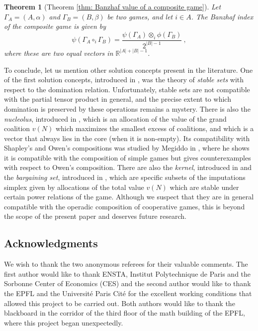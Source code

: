 \documentclass[a4paper,12pt]{amsart}
\newtheorem{theoremintro}{Theorem}
\begin{document}
\begin{theoremintro}[Theorem \ref{thm: Banzhaf value of a composite game}]
Let \(\Gamma_A = (A, \alpha)\) and \(\Gamma_B = (B, \beta)\) be two games, and let \(i \in A\). The Banzhaf index of the composite game is given by 
    \[
    \psi \left(\Gamma_A \circ_i \Gamma_B \right) = \frac{\psi(\Gamma_A) \otimes_i \phi(\Gamma_B)}{2^{\lvert B \rvert - 1}} ~,
    \]
    where these are two equal vectors in $\mathbb{R}^{\lvert A \rvert + \lvert B \rvert -1}$.    
\end{theoremintro}

To conclude, let us mention other solution concepts present in the literature. One of the first solution concepts, introduced in \cite{vonNeumann2}, was the theory of \textit{stable sets} with respect to the domination relation. Unfortunately, stable sets are not compatible with the partial tensor product in general, and the precise extent to which domination is preserved by these operations remains a mystery. There is also the \textit{nucleolus}, introduced in \cite{schmeidler1969nucleolus}, which is an allocation of the value of the grand coalition $v(N)$ which maximizes the smallest excess of coalitions, and which is a vector that always lies in the core (when it is non-empty). Its compatibility with Shapley's and Owen's compositions was studied by Megiddo in \cite{MegiddoKernel,MegiddoNucleolus}, where he shows it is compatible with the composition of simple games but gives counterexamples with respect to Owen's composition. There are also the \textit{kernel}, introduced in \cite{DavisMaschler63} and the \textit{bargaining set}, introduced in \cite{AumannMaschler64}, which are specific subsets of the imputations simplex given by allocations of the total value $v(N)$ which are stable under certain power relations of the game. Although we suspect that they are in general compatible with the operadic composition of cooperative games, this is beyond the scope of the present paper and deserves future research. 

\subsection*{Acknowledgments} We wish to thank the two anonymous referees for their valuable comments. The first author would like to thank ENSTA, Institut Polytechnique de Paris and the Sorbonne Center of Economics (CES) and the second author would like to thank the EPFL and the Université Paris Cité for the excellent working conditions that allowed this project to be carried out. Both authors would like to thank the blackboard in the corridor of the third floor of the math building of the EPFL, where this project began unexpectedly. 
\end{document}
